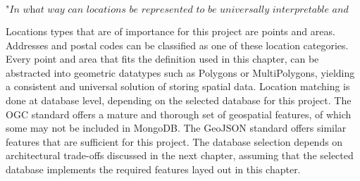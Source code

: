 \[\textit{"In what way can locations be represented to be universally interpretable and precise?"}\] \hfill

Locations types that are of importance for this project are points and areas. Addresses and postal codes can be classified as one of these location categories. Every point and area that fits the definition used in this chapter, can be abstracted into geometric datatypes such as Polygons or MultiPolygons, yielding a consistent and universal solution of storing spatial data. Location matching is done at database level, depending on the selected database for this project. The OGC standard offers a mature and thorough set of geospatial features, of which some may not be included in MongoDB. The GeoJSON standard offers similar features that are sufficient for this project. The database selection depends on architectural trade-offs discussed in the next chapter, assuming that the selected database implements the required features layed out in this chapter.
